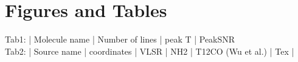 \section{Figures and Tables}
 Tab1: | Molecule name | Number of lines | peak T | PeakSNR \\ 
 Tab2: | Source name | coordinates | VLSR | NH2 | T12CO (Wu et al.) | Tex | 

 
  
  
  
  
  
  
  
  
